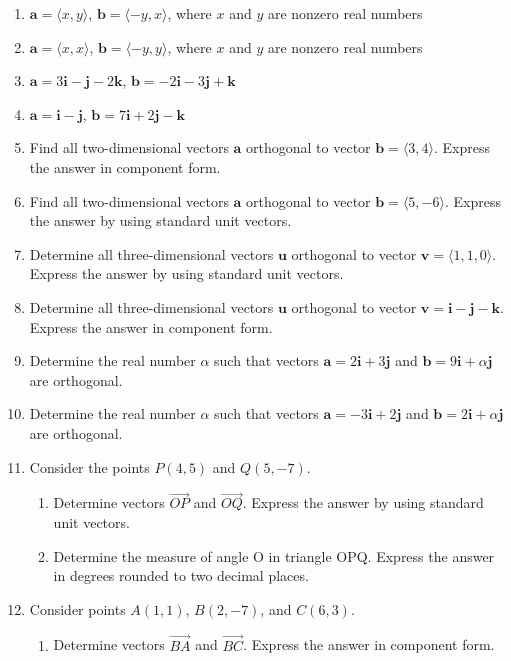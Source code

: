 \documentclass{exercises}
\begin{document}
\begin{enumerate}[resume]
\item $\mathbf{a}=\langle x,y\rangle$, $\mathbf{b}=\langle-y,x\rangle$, where $x$ and $y$ are nonzero real numbers
\item $\mathbf{a}=\langle x,x\rangle$, $\mathbf{b}=\langle-y,y\rangle$, where $x$ and $y$ are nonzero real numbers
\item $\mathbf{a}=3\mathbf{i}-\mathbf{j}-2\mathbf{k}$, $\mathbf{b}=-2\mathbf{i}-3\mathbf{j}+\mathbf{k}$
\item $\mathbf{a}=\mathbf{i}-\mathbf{j}$, $\mathbf{b}=7\mathbf{i}+2\mathbf{j}-\mathbf{k}$
\item Find all two-dimensional vectors $\mathbf{a}$ orthogonal to vector $\mathbf{b}=\langle3,4\rangle$. Express the answer in component form.
\item Find all two-dimensional vectors $\mathbf{a}$ orthogonal to vector $\mathbf{b}=\langle5,-6\rangle$. Express the answer by using standard unit vectors.
\item Determine all three-dimensional vectors $\mathbf{u}$ orthogonal to vector $\mathbf{v}=\langle1,1,0\rangle$. Express the answer by using standard unit vectors.
\item Determine all three-dimensional vectors $\mathbf{u}$ orthogonal to vector $\mathbf{v}=\mathbf{i}-\mathbf{j}-\mathbf{k}$. Express the answer in component form.
\item Determine the real number $\alpha$ such that vectors $\mathbf{a}=2\mathbf{i}+3\mathbf{j}$ and $\mathbf{b}=9\mathbf{i}+\alpha \mathbf{j}$ are orthogonal.
\item Determine the real number $\alpha$ such that vectors $\mathbf{a}=-3\mathbf{i}+2\mathbf{j}$ and $\mathbf{b}=2\mathbf{i}+\alpha \mathbf{j}$ are orthogonal.
\item \techrequired Consider the points $P(4,5)$ and $Q(5,-7)$.
\begin{enumerate}[label=(\alph*)]
  \item Determine vectors $\overset{\to}{OP}$ and $\overset{\to}{OQ}$. Express the answer by using standard unit vectors.
  \item Determine the measure of angle O in triangle OPQ. Express the answer in degrees rounded to two decimal places.
\end{enumerate}
\item \techrequired Consider points $A(1,1)$, $B(2,-7)$, and $C(6,3)$.
\begin{enumerate}[label=(\alph*)]
  \item Determine vectors $\overset{\to}{BA}$ and $\overset{\to}{BC}$. Express the answer in component form.

\end{enumerate}
\end{enumerate}
\end{document}
